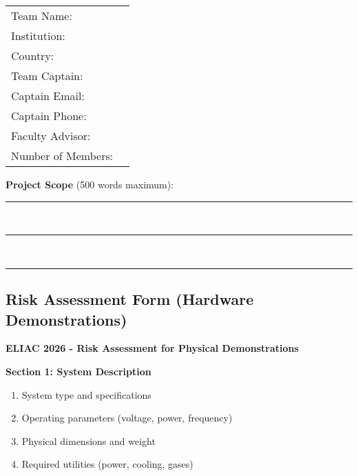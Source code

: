 \vspace{1em}
\begin{tabular}{ll}
Team Name: & \underline{\hspace{8cm}} \\[0.5em]
Institution: & \underline{\hspace{8cm}} \\[0.5em]
Country: & \underline{\hspace{8cm}} \\[0.5em]
Team Captain: & \underline{\hspace{8cm}} \\[0.5em]
Captain Email: & \underline{\hspace{8cm}} \\[0.5em]
Captain Phone: & \underline{\hspace{8cm}} \\[0.5em]
Faculty Advisor: & \underline{\hspace{8cm}} \\[0.5em]
Number of Members: & \underline{\hspace{8cm}} \\[0.5em]
\end{tabular}

\vspace{1em}
\noindent\textbf{Project Scope} (500 words maximum):\\
\noindent\rule{\textwidth}{0.5pt}\\
\noindent\rule{\textwidth}{0.5pt}\\
\noindent\rule{\textwidth}{0.5pt}

\subsection{Risk Assessment Form (Hardware Demonstrations)}

\noindent\textbf{ELIAC 2026 - Risk Assessment for Physical Demonstrations}

\vspace{1em}
\noindent\textbf{Section 1: System Description}
\begin{enumerate}[noitemsep]
    \item System type and specifications
    \item Operating parameters (voltage, power, frequency)
    \item Physical dimensions and weight
    \item Required utilities (power, cooling, gases)
\end{enumerate}

